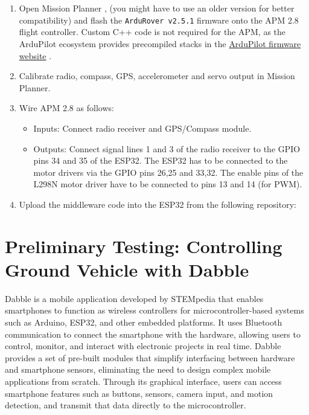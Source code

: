 \documentclass[conference]{IEEEtran}
\begin{document}
\section{}
\label{app:misplan}
\begin{enumerate}
	\item Open Mission Planner \cite{missionplanner},
		(you might have to use an older version for better compatibility) and flash the \texttt{ArduRover v2.5.1} firmware onto the APM 2.8 flight controller. Custom C++ code is not required for the APM, as the ArduPilot ecosystem provides precompiled stacks in the \href{https://firmware.ardupilot.org/Rover/}{ArduPilot firmware website} \cite{ardufirmware}.
    \item Calibrate radio, compass, GPS, accelerometer and servo output in Mission Planner.
    \item Wire APM 2.8 as follows:
    \begin{itemize}
        \item Inputs: Connect radio receiver and GPS/Compass module. %
        \item Outputs: Connect signal lines 1 and 3 of the radio receiver to the GPIO pins 34 and 35 of the ESP32. The ESP32 has to be connected to the motor drivers via the GPIO pins 26,25 and 33,32. The enable pins of the L298N motor driver have to be connected to pins 13 and 14 (for PWM). 
    \end{itemize}
    \item Upload the middleware code into the ESP32 from the following repository:
\end{enumerate}

\iffalse
\section{Preliminary Testing: Controlling Ground Vehicle with Dabble}

Dabble\cite{dabble} is a mobile application developed by STEMpedia that enables smartphones to function as wireless controllers for microcontroller-based systems such as Arduino, ESP32, and other embedded platforms. It uses Bluetooth communication to connect the smartphone with the hardware, allowing users to control, monitor, and interact with electronic projects in real time.
Dabble provides a set of pre-built modules that simplify interfacing between hardware and smartphone sensors, eliminating the need to design complex mobile applications from scratch. Through its graphical interface, users can access smartphone features such as buttons, sensors, camera input, and motion detection, and transmit that data directly to the microcontroller.
\end{document}
